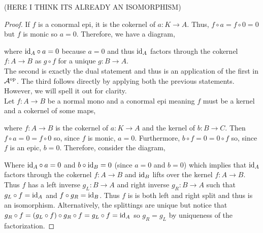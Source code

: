 \documentclass[12pt]{article}
\newcommand{\A}{\mathcal{A}}
\begin{document}
(HERE I THINK ITS ALREADY AN ISOMORPHISM)

\begin{proof}
If $f$ is a conormal epi, it is the cokernel of $a : K \to A$. Thus, $f \circ a = f \circ 0 = 0$ but $f$ is monic so $a = 0$. Therefore, we have a diagram,
\begin{center}
\end{center}
where $\mathrm{id}_A \circ a = 0$ because $a = 0$ and thus $\mathrm{id}_A$ factors through the cokernel $f : A \to B$ as $g \circ f$ for a unique $g : B \to A$.
\bigskip\\
The second is exactly the dual statement and thus is an application of the first in $\A^{\op}$. The third follows directly by applying both the previous statements. However, we will spell it out for clarity.
\bigskip\\
Let $f : A \to B$ be a normal mono and a conormal epi meaning $f$ must be a kernel and a cokernel of some maps,
\begin{center}
\end{center}
where $f : A \to B$ is the cokernel of $a : K \to A$ and the kernel of $b : B \to C$. Then $f \circ a = 0 = f \circ 0$ so, since $f$ is monic, $a = 0$. Furthermore, $b \circ f = 0 = 0 \circ f$ so, since $f$ is an epic, $b = 0$. Therefore, consider the diagram,
\begin{center}
\end{center} 
Where $\mathrm{id}_A \circ a = 0$ and $b \circ \mathrm{id}_B = 0$ (since $a = 0$ and $b = 0$) which implies that $\mathrm{id}_A$ factors through the cokernel $f :A \to B$ and $\mathrm{id}_B$ lifts over the kernel $f : A \to B$. Thus $f$ has a left inverse $g_L : B \to A$ and right inverse $g_R : B \to A$ such that $g_L \circ f = \mathrm{id}_A$ and $f \circ g_R = \mathrm{id}_B$. Thus $f$ is is both left and right split and thus is an isomorphism. Alternatively, the splittings are unique but notice that $g_R \circ f = (g_L \circ f) \circ g_R \circ f = g_L \circ f = \mathrm{id}_A$ so $g_R = g_L$ by uniqueness of the factorization.
\end{proof}
\end{document}

